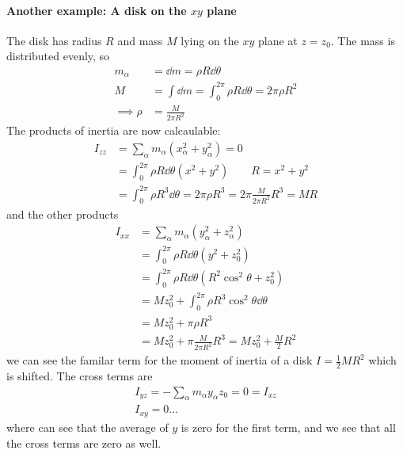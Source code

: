 \documentclass[../main.tex]{subfiles}
\begin{document}
\paragraph*{Another example: A disk on the $xy$ plane} The disk has radius $R$ and mass $M$ lying
on the $xy$ plane at $z = z_0$. The mass is distributed evenly, so
\begin{align*}
    m_\alpha &= \dd{m} = \rho R \dd{\theta} \\
    M &= \int \dd{m} = \int_0^{2\pi} \rho R \dd{\theta} = 2\pi \rho R^2 \\
    \implies \rho &= \frac{M}{2\pi R^2}
\end{align*}
The products of inertia are now calcaulable:
\begin{align*}
    I_{zz} &= \sum_\alpha m_\alpha (x_\alpha^2 + y_\alpha^2) = 0 \\
        &= \int_0^{2\pi} \rho R \dd{\theta} (x^2 + y^2) \qquad R = x^2 + y^2 \\
        &= \int_0^{2\pi} \rho R^3 \dd{\theta} = 2\pi \rho R^3 = 2\pi \frac{M}{2\pi R^2} R^3 = MR
\end{align*}
and the other products
\begin{align*}
    I_{xx} &= \sum_\alpha m_\alpha (y_\alpha^2 + z_\alpha^2) \\
        &= \int_0^{2\pi} \rho R \dd{\theta} (y^2 + z_0^2) \\
        &= \int_0^{2\pi} \rho R \dd{\theta} (R^2\cos^2\theta + z_0^2) \\
        &= Mz_0^2 + \int_0^{2\pi} \rho R^3 \cos^2\theta \dd{\theta} \\
        &= Mz_0^2 + \pi \rho R^3 \\
        &= Mz_0^2 + \pi \frac{M}{2\pi R^2} R^3 = Mz_0^2 + \frac{M}{2}R^2
\end{align*}
we can see the familar term for the moment of inertia of a disk $I = \frac{1}{2}MR^2$ which is 
shifted. The cross terms are
\begin{align*}
    I_{yz} = -\sum_\alpha m_\alpha y_\alpha z_0 = 0 = I_{xz} \\
    I_{xy} = 0 \dots
\end{align*}
where can see that the average of $y$ is zero for the first term, and we see that all the cross
terms are zero as well.
\end{document}
